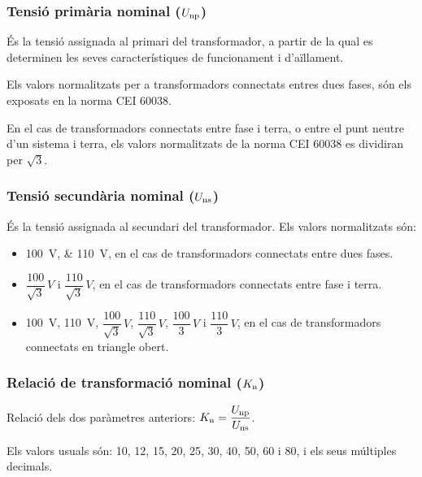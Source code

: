 \subsubsection{Tensió primària nominal ($U_\mathrm{np}$)}

És la tensió assignada al primari del transformador, a partir de la
qual es determinen les seves característiques de funcionament i
d'aïllament.

Els valors normalitzats per a transformadors connectats entres dues fases, són els exposats en la norma CEI 60038.

En el cas de transformadors connectats entre fase i terra, o entre el punt neutre d'un sistema i terra, els valors normalitzats de la norma CEI 60038 es dividiran per $\sqrt{3}$.


\subsubsection{Tensió secundària nominal ($U_\mathrm{ns}$)}

És la tensió assignada al secundari del transformador.
Els valors normalitzats són:
\begin{itemize}
    \item \SIlist{100;110}{V}, en el cas de transformadors connectats
    entre dues fases.
    \item $\dfrac{100}{\sqrt{3}}\si{\,V}$ i
        $\dfrac{110}{\sqrt{3}}\si{\,V}$, en el cas de transformadors
        connectats entre fase i terra.
    \item \SI{100}{V}, \SI{110}{V}, $\dfrac{100}{\sqrt{3}}\si{\,V}$,
    $\dfrac{110}{\sqrt{3}}\si{\,V}$, $\dfrac{100}{3}\si{\,V}$   i
    $\dfrac{110}{3}\si{\,V}$, en el cas de transformadors
    connectats en triangle obert.
\end{itemize}

\subsubsection{Relació de transformació nominal ($K_\mathrm{n}$)}

 Relació  dels dos paràmetres anteriors: $K_\mathrm{n} = \dfrac{U_\mathrm{np}}{U_\mathrm{ns}}$.

 Els valors usuals són: 10, 12, 15, 20, 25, 30, 40, 50, 60 i 80, i els seus múltiples decimals.


